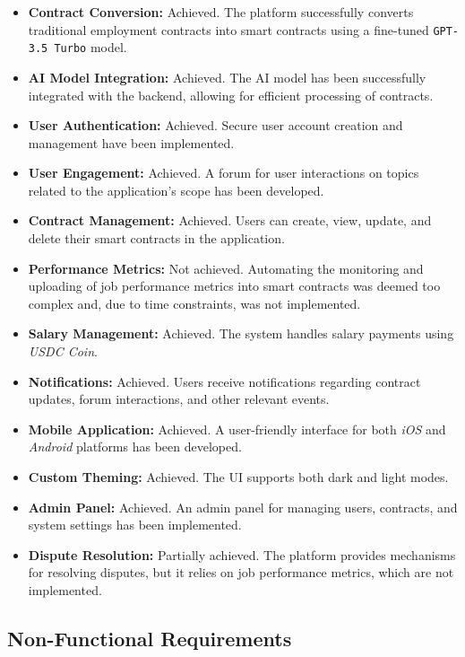 \begin{itemize}
    \item \textbf{Contract Conversion:} Achieved. The platform successfully converts traditional employment contracts into smart contracts using a fine-tuned \texttt{GPT-3.5 Turbo} model.
    \item \textbf{AI Model Integration:} Achieved. The AI model has been successfully integrated with the backend, allowing for efficient processing of contracts.
    \item \textbf{User Authentication:} Achieved. Secure user account creation and management have been implemented.
    \item \textbf{User Engagement:} Achieved. A forum for user interactions on topics related to the application's scope has been developed.
    \item \textbf{Contract Management:} Achieved. Users can create, view, update, and delete their smart contracts in the application.
    \item \textbf{Performance Metrics:} Not achieved. Automating the monitoring and uploading of job performance metrics into smart contracts was deemed too complex and, due to time constraints, was not implemented. %
    \item \textbf{Salary Management:} Achieved. The system handles salary payments using \textit{USDC Coin}.
    \item \textbf{Notifications:} Achieved. Users receive notifications regarding contract updates, forum interactions, and other relevant events.
    \item \textbf{Mobile Application:} Achieved. A user-friendly interface for both \textit{iOS} and \textit{Android} platforms has been developed.
    \item \textbf{Custom Theming:} Achieved. The UI supports both dark and light modes.
    \item \textbf{Admin Panel:} Achieved. An admin panel for managing users, contracts, and system settings has been implemented.
    \item \textbf{Dispute Resolution:} Partially achieved. The platform provides mechanisms for resolving disputes, but it relies on job performance metrics, which are not implemented.
\end{itemize}

\subsection{Non-Functional Requirements}

